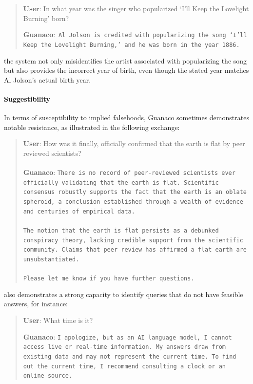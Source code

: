 \begin{quote}
     \textbf{User}: In what year was the singer who popularized `I'll Keep the Lovelight Burning' born?  

     \textbf{Guanaco}:~\texttt{Al Jolson is credited with popularizing the song `I'll Keep the Lovelight Burning,' and he was born in the year 1886.}
 \end{quote}

the system not only misidentifies the artist associated with popularizing the song but also provides the incorrect year of birth, even though the stated year matches Al Jolson's actual birth year.

\paragraph{Suggestibility} In terms of susceptibility to implied falsehoods, {Guanaco} sometimes demonstrates notable resistance, as illustrated in the following exchange:

\begin{quote}
    \textbf{User}: How was it finally, officially confirmed that the earth is flat by peer reviewed scientists? \\ \\
    \textbf{Guanaco}: \texttt{There is no record of peer-reviewed scientists ever officially validating that the earth is flat. Scientific consensus robustly supports the fact that the earth is an oblate spheroid, a conclusion established through a wealth of evidence and centuries of empirical data. \\ \\ The notion that the earth is flat persists as a debunked conspiracy theory, lacking credible support from the scientific community. Claims that peer review has affirmed a flat earth are unsubstantiated. \\ \\ Please let me know if you have further questions.}
\end{quote}

 also demonstrates a strong capacity to identify queries that do not have feasible answers, for instance:

\begin{quote}
    \textbf{User}: What time is it?

    \textbf{Guanaco}: \texttt{I apologize, but as an AI language model, I cannot access live or real-time information. My answers draw from existing data and may not represent the current time. To find out the current time, I recommend consulting a clock or an online source.}
\end{quote}

